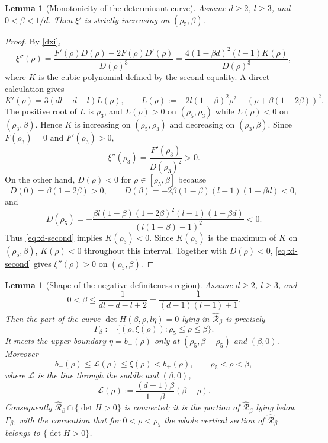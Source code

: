 \documentclass[11pt]{amsart}
\theoremstyle{plain}
\newtheorem{lemma}[theorem]{Lemma}
\numberwithin{equation}{section}
\numberwithin{theorem}{section}
\numberwithin{figure}{section}
\begin{document}
\begin{lemma}[Monotonicity of the determinant curve]\label{l39}
Assume $d\geq2$, $l\geq3$, and $0<\beta<1/d$.  Then $\xi'$ is strictly increasing on
$(\rho_5,\beta)$.
\end{lemma}

\begin{proof}
By \eqref{dxi},
\begin{equation}
\xi''(\rho)=\frac{F'(\rho)D(\rho)-2F(\rho)D'(\rho)}{D(\rho)^3}
=\frac{4(1-\beta d)^2(l-1)K(\rho)}{D(\rho)^3},
\label{eq:xi-second}
\end{equation}
where $K$ is the cubic polynomial defined by the second equality.  A direct calculation gives
\begin{equation}
K'(\rho)=3(dl-d-l)L(\rho),
\qquad
L(\rho):=-2l(1-\beta)^2\rho^2+(\rho+\beta(1-2\beta))^2.
\label{dkr}
\end{equation}
The positive root of $L$ is $\rho_3$, and $L(\rho)>0$ on $(\rho_5,\rho_3)$ while
$L(\rho)<0$ on $(\rho_3,\beta)$.  Hence $K$ is increasing on $(\rho_5,\rho_3)$ and
decreasing on $(\rho_3,\beta)$.  Since $F(\rho_3)=0$ and $F'(\rho_3)>0$,
\[
\xi''(\rho_3)=\frac{F'(\rho_3)}{D(\rho_3)^2}>0.
\]
On the other hand, $D(\rho)<0$ for $\rho\in[\rho_5,\beta]$ because
\[
D(0)=\beta(1-2\beta)>0,
\qquad
D(\beta)=-2\beta(1-\beta)(l-1)(1-\beta d)<0,
\]
and
\[
D(\rho_5)=-\frac{\beta l(1-\beta)(1-2\beta)^2(l-1)(1-\beta d)}{(l(1-\beta)-1)^2}<0.
\]
Thus \eqref{eq:xi-second} implies $K(\rho_3)<0$.  Since $K(\rho_3)$ is the maximum of
$K$ on $(\rho_5,\beta)$, $K(\rho)<0$ throughout this interval.  Together with
$D(\rho)<0$, \eqref{eq:xi-second} gives $\xi''(\rho)>0$ on $(\rho_5,\beta)$.
\end{proof}

\begin{lemma}[Shape of the negative-definiteness region]\label{l313}
Assume $d\geq2$, $l\geq3$, and
\begin{equation}
0<\beta\leq \frac1{dl-d-l+2}=\frac1{(d-1)(l-1)+1}.
\label{bl1}
\end{equation}
Then the part of the curve $\det H(\beta,\rho,l\eta)=0$ lying in
$\overline{\widehat{\mathcal R}_\beta}$ is precisely
\begin{equation*}
\Gamma_\beta:=\{(\rho,\xi(\rho)): \rho_5\leq \rho\leq \beta\}.
\end{equation*}
It meets the upper boundary $\eta=b_+(\rho)$ only at
$(\rho_5,\beta-\rho_5)$ and $(\beta,0)$.  Moreover
\begin{equation}
b_-(\rho)\leq \mathcal L(\rho)\leq \xi(\rho)<b_+(\rho),
\qquad \rho_5<\rho<\beta,
\label{eq:line-xi-order}
\end{equation}
where $\mathcal L$ is the line through the saddle and $(\beta,0)$,
\begin{equation}
\mathcal L(\rho):=\frac{(d-1)\beta}{1-\beta}(\beta-\rho).
\label{eq:line-L}
\end{equation}
Consequently $\widehat{\mathcal R}_\beta\cap\{\det H>0\}$ is connected; it is the portion
of $\widehat{\mathcal R}_\beta$ lying below $\Gamma_\beta$, with the convention that for
$0<\rho<\rho_5$ the whole vertical section of $\widehat{\mathcal R}_\beta$ belongs to
$\{\det H>0\}$.
\end{lemma}
\end{document}
